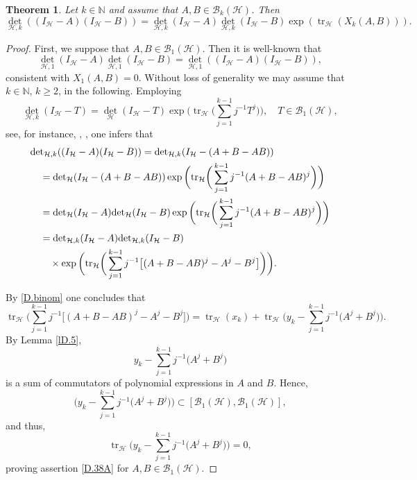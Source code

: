 \documentclass[reqno,10pt,centertags]{amsart}
\newcommand{\bbN}{{\mathbb{N}}}
\newcommand{\cB}{{\mathcal B}}
\newcommand{\cH}{{\mathcal H}}
\DeclareMathOperator{\tr}{tr}
\newcommand{\no}{\notag}
\newcommand{\lb}{\label}
\let\geq\geqslant
\numberwithin{equation}{section}
\newtheorem{theorem}{Theorem}[section]
\theoremstyle{remark}
\begin{document}
\begin{theorem} Let $k \in \bbN$ and assume that $A,B\in \cB_k(\cH)$. Then 
\begin{equation} 
{\det}_{\cH,k}((I_{\cH}-A)(I_{\cH}-B))={\det}_{\cH,k}(I_{\cH}-A) {\det}_{\cH,k}(I_{\cH}-B) \exp({\tr}_{\cH}(X_k(A,B))).   \lb{D.38A} 
\end{equation} 
\end{theorem}
\begin{proof} First, we suppose that $A,B\in\cB_1(\cH)$. Then it is well-known that
\begin{equation} 
{\det}_{\cH,1}(I_{\cH}-A) {\det}_{\cH,1}(I_{\cH}-B)={\det}_{\cH,1}((I_{\cH}-A)(I_{\cH}-B)),
\end{equation} 
consistent with $X_1(A,B) = 0$. Without loss of generality we may assume that $k \in \bbN$, $k \geq 2$, in 
the following. Employing 
\begin{equation} 
{\det}_{\cH,k}(I_{\cH}-T)={\det}_{\cH}(I_{\cH}-T) \exp\bigg({\tr}_{\cH}\bigg(\sum_{j=1}^{k-1} j^{-1} T^j\bigg)\bigg), 
\quad T \in \cB_1(\cH), 
\end{equation} 
see, for instance, \cite[Lemma~XI.9.22\,(e)]{DS88}, \cite[Theorem~9.2\,(d)]{Si05}, one infers that 
\begin{align} 
&{\det}_{\cH,k}((I_{\cH}-A)(I_{\cH}-B))={\det}_{\cH,k}(I_{\cH}-(A+B-AB))     \no \\
& \quad ={\det}_{\cH}(I_{\cH}-(A+B-AB)) 
\exp\bigg({\tr}_{\cH}\bigg(\sum_{j=1}^{k-1} j^{-1} (A+B-AB)^j\bigg)\bigg)  \no \\
& \quad ={\det}_{\cH}(I_{\cH}-A) {\det}_{\cH}(I_{\cH}-B) 
\exp\bigg({\tr}_{\cH}\bigg(\sum_{j=1}^{k-1} j^{-1} (A+B-AB)^j\bigg)\bigg)    \no \\
& \quad ={\det}_{\cH,k}(I_{\cH}-A) {\det}_{\cH,k}(I_{\cH}-B)   \no \\
& \qquad \times \exp\bigg({\tr}_{\cH}\bigg(\sum_{j=1}^{k-1} j^{-1} \big[(A+B-AB)^j-A^j-B^j\big]\bigg)\bigg).
\end{align} 

By \eqref{D.binom} one concludes that 
\begin{equation} 
{\tr}_{\cH}\bigg(\sum_{j=1}^{k-1} j^{-1} \big[(A+B-AB)^j-A^j-B^j\big]\bigg) 
= {\tr}_{\cH}(x_k) + {\tr}_{\cH}\bigg(y_k-\sum_{j=1}^{k-1} j^{-1} \big(A^j+B^j\big)\bigg).
\end{equation} 
By Lemma \ref{lD.5}, 
\begin{equation} 
y_k-\sum_{j=1}^{k-1} j^{-1} \big(A^j+B^j\big)
\end{equation} 
is a sum of commutators of polynomial expressions in $A$ and $B$. Hence, 
\begin{equation} 
\bigg(y_k-\sum_{j=1}^{k-1} j^{-1} \big(A^j+B^j\big)\bigg) \subset [\cB_1(\cH),\cB_1(\cH)], 
\end{equation} 
and thus, 
\begin{equation} 
{\tr}_{\cH} \bigg(y_k-\sum_{j=1}^{k-1} j^{-1} \big(A^j+B^j\big)\bigg)=0, 
\end{equation} 
proving assertion \eqref{D.38A} for $A,B\in\cB_1(\cH)$.


\end{proof}
\end{document}

